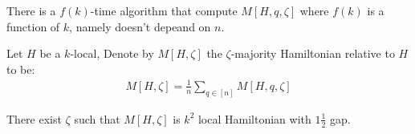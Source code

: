 \documentclass[manuscript,screen,review]{acmart}
\begin{document}
\begin{claim}
  There is a $f(k)$-time algorithm that compute $M[H,q,\zeta]$ where $f(k)$ is a function of $k$, namely doesn't depeand on $n$. 
\end{claim}

\begin{definition} \label{definition}  
  Let $H$ be a $k$-local, Denote by $M[H, \zeta]$ the $\zeta$-majority Hamiltonian relative to $H$ to be: 
  \begin{equation*}
    \begin{split}
      M[H,\zeta] = \frac{1}{n}\sum_{q\in[n]}{ M[H,q,\zeta]} 
    \end{split}
  \end{equation*}
\end{definition}

\begin{claim}
  There exist $\zeta$ such that $M[H,\zeta]$ is $k^{2}$ local Hamiltonian with $1\frac{1}{2}$ gap.   
\end{claim}
\end{document}
